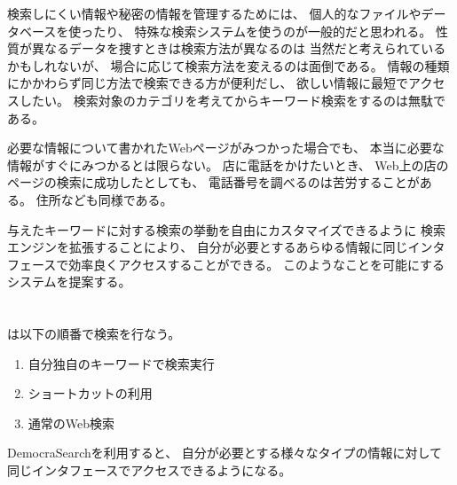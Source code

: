 \documentclass{ipsjprosym}
\begin{document}

検索しにくい情報や秘密の情報を管理するためには、
個人的なファイルやデータベースを使ったり、
特殊な検索システムを使うのが一般的だと思われる。
性質が異なるデータを捜すときは検索方法が異なるのは
当然だと考えられているかもしれないが、
場合に応じて検索方法を変えるのは面倒である。
情報の種類にかかわらず同じ方法で検索できる方が便利だし、
欲しい情報に最短でアクセスしたい。
検索対象のカテゴリを考えてからキーワード検索をするのは無駄である。

必要な情報について書かれたWebページがみつかった場合でも、
本当に必要な情報がすぐにみつかるとは限らない。
店に電話をかけたいとき、
Web上の店のページの検索に成功したとしても、
電話番号を調べるのは苦労することがある。
住所なども同様である。

与えたキーワードに対する検索の挙動を自由にカスタマイズできるように
検索エンジンを拡張することにより、
自分が必要とするあらゆる情報に同じインタフェースで効率良くアクセスすることができる。
このようなことを可能にする\textbf{\ds}システムを提案する。


\section{\ds}

{\ds}は以下の順番で検索を行なう。


\begin{enumerate}
\item 自分独自のキーワードで検索実行
\item ショートカットの利用
\item 通常のWeb検索
\end{enumerate}

\vspace{2mm}
\noindent
DemocraSearchを利用すると、
自分が必要とする様々なタイプの情報に対して
同じインタフェースでアクセスできるようになる。
\end{document}
